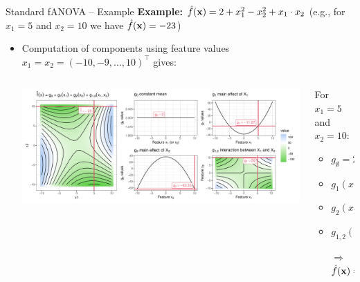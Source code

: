 \documentclass[10pt,compress,t,notes=noshow, xcolor=table]{beamer}
\newcommand{\open}{}
\newcommand{\close}{}
\begin{document}
\begin{frame}{Standard fANOVA -- Example}
\textbf{Example:} $\hat{f}(\mathbf{x}) = 2 + x_1^2 - x_2^2 + x_1 \cdot x_2$ (e.g., for $x_1 = 5$ and $x_2 = 10$ we have $\hat{f}(\mathbf{x}) = -23$)

\begin{itemize}
    \item Computation of components using feature values $x_1 = x_2 = (-10, -9, \ldots, 10)^\top$ gives:
    \begin{columns}[c, totalwidth=\linewidth]
    \begin{column}{0.75\textwidth}
        \includegraphics[width = \textwidth]{figure/decomposition}
    \end{column}
    \begin{column}{0.25\textwidth}
    For $x_1 = 5$ and $x_2 = 10$:\\
    \begin{itemize}
        \item $g_{\open \emptyset \close} = 2$
        \item $g_{\open 1 \close}(x_1) = -9.67$
        \item $g_{\open 2 \close}(x_2) = -65.33$
        \item $g_{\open 1,2 \close}(x_1, x_2) = 50$
        \item[$\Rightarrow$] $\hat{f}(\mathbf{x}) = -23$
    \end{itemize}
    \end{column}
    \end{columns}
\end{itemize} 
\end{frame}
\end{document}
